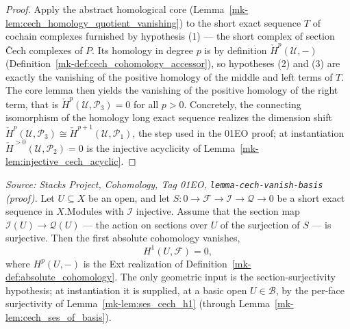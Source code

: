 \begin{proof}
  \leanok
  Apply the abstract homological core (Lemma~\ref{mk-lem:cech_homology_quotient_vanishing}) to the
  short exact sequence \(T\) of cochain complexes furnished by hypothesis (1) — the short complex of
  section {\v C}ech complexes of \(P\). Its homology in degree \(p\) is by definition
  \(\check{H}^p(\mathcal{U}, -)\) (Definition~\ref{mk-def:cech_cohomology_accessor}), so hypotheses (2)
  and (3) are exactly the vanishing of the positive homology of the middle and left terms of \(T\).
  The core lemma then yields the vanishing of the positive homology of the right term, that is
  \(\check{H}^p(\mathcal{U}, \mathcal{P}_3) = 0\) for all \(p > 0\). Concretely, the connecting
  isomorphism of the homology long exact sequence realizes the dimension shift
  \(\check{H}^p(\mathcal{U}, \mathcal{P}_3) \cong \check{H}^{p+1}(\mathcal{U}, \mathcal{P}_1)\), the
  step used in the 01EO proof; at instantiation \(\check{H}^{>0}(\mathcal{U}, \mathcal{P}_2) = 0\) is
  the injective acyclicity of Lemma~\ref{mk-lem:injective_cech_acyclic}.
\end{proof}

\begin{lemma}[Sheaf-cohomology base case \(H^1(U, \mathcal{F}) = 0\)]\label{mk-lem:absolute_cohomology_one_vanishing}
  \leanok

  \textit{Source: Stacks Project, Cohomology, Tag 01EO,
  \texttt{lemma-cech-vanish-basis} (proof).}
  Let \(U \subseteq X\) be an open, and let
  \(S : 0 \to \mathcal{F} \to \mathcal{I} \to \mathcal{Q} \to 0\) be a short exact sequence in
  \(X.\mathrm{Modules}\) with \(\mathcal{I}\) injective. Assume that the section map
  \(\mathcal{I}(U) \to \mathcal{Q}(U)\) — the action on sections over \(U\) of the surjection of
  \(S\) — is surjective. Then the first absolute cohomology vanishes,
  \[
    H^1(U, \mathcal{F}) = 0,
  \]
  where \(H^p(U, -)\) is the Ext realization of Definition~\ref{mk-def:absolute_cohomology}. The only
  geometric input is the section-surjectivity hypothesis; at instantiation it is supplied, at a basic
  open \(U \in \mathcal{B}\), by the per-face surjectivity of Lemma~\ref{mk-lem:ses_cech_h1} (through
  Lemma~\ref{mk-lem:cech_ses_of_basis}).
\end{lemma}

